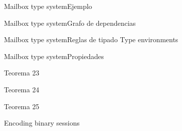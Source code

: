 \documentclass{beamer}
\begin{document}
\begin{frame}{Mailbox type system}{Ejemplo}
\end{frame}

\begin{frame}{Mailbox type system}{Grafo de dependencias}
\end{frame}

\begin{frame}{Mailbox type system}{Reglas de tipado}
    Type environments
\end{frame}

\begin{frame}{Mailbox type system}{Propiedades}
    \begin{block}{Teorema 23}
    \end{block}
    \begin{block}{Teorema 24}
    \end{block}
    \begin{block}{Teorema 25}
    \end{block}
\end{frame}

\begin{frame}{Encoding binary sessions}
\end{frame}
\end{document}
